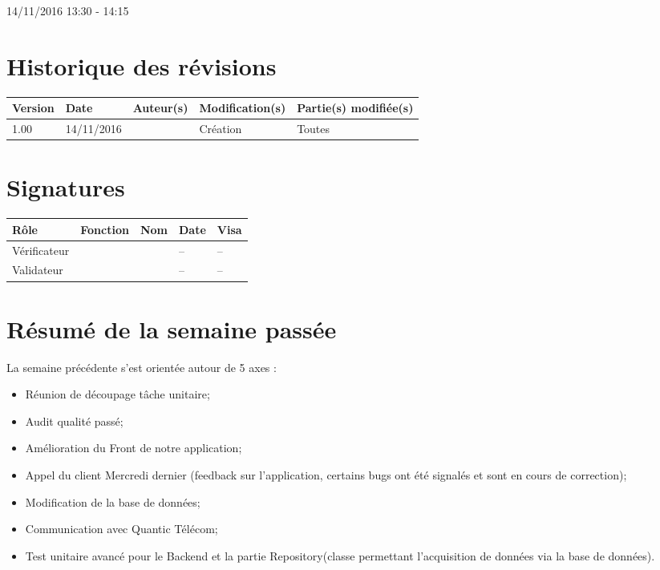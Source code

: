 \documentclass [a4paper] {article}
\begin{document}
14/11/2016			 				%
\hfill   
\hfill 	 13:30 - 14:15				%


\section*{Historique des révisions}
\begin{center}
			\begin{tabular}{| p{2.5cm} | p{3cm} | p{3cm} | p{3cm} | p{3.5cm} |}
				\hline
				\rowcolor{Gray}
				Version & Date & Auteur(s) & Modification(s) & Partie(s) modifiée(s)		 \\
				\hline
				1.00 & 14/11/2016 & \Kafui & Création & Toutes \\
				\hline			
			\end{tabular}
		\end{center}

\section*{Signatures}

		\begin{center}
			\begin{tabular}{| p{2.5cm} | p{4cm} | p{3cm} | p{3cm} | p{2.5cm} |}
				\hline
				\rowcolor{Gray}
				Rôle & Fonction & Nom & Date & Visa		 \\
				\hline
				Vérificateur & \RGC & \Melissa & -- & -- \\[30pt]
				\hline
				Validateur & \CP & \Pierre &  -- & -- \\[30pt]	
				\hline
			\end{tabular}
		\end{center}

\section{Résumé de la semaine passée}
La semaine précédente s'est orientée autour de 5 axes :  
\begin{itemize}
	\item Réunion de découpage tâche unitaire;
	\item Audit qualité passé;
	\item Amélioration du Front de notre application;
	\item Appel du client Mercredi dernier (feedback sur l'application, certains bugs ont été signalés et sont en cours de correction);
	\item Modification de la base de données;
	\item Communication avec Quantic Télécom;
	\item Test unitaire avancé pour le Backend et la partie Repository(classe permettant l'acquisition de données via la base de données).
\end{itemize} 
\end{document}
